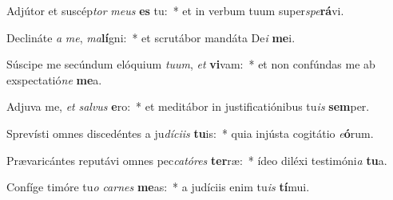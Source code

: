\item Adjútor et suscép\textit{tor} \textit{me}\textit{us} \textbf{es} tu:~* et in verbum tuum super\textit{spe}\textbf{rá}vi.
\item Declináte \textit{a} \textit{me}, \textit{ma}\textbf{lí}gni:~* et scrutábor mandáta De\textit{i} \textbf{me}i.
\item Súscipe me secúndum elóquium \textit{tu}\textit{um}, \textit{et} \textbf{vi}vam:~* et non confúndas me ab exspectatió\textit{ne} \textbf{me}a.
\item Adjuva me, \textit{et} \textit{sal}\textit{vus} \textbf{e}ro:~* et meditábor in justificatiónibus tu\textit{is} \textbf{sem}per.
\item Sprevísti omnes discedéntes a ju\textit{dí}\textit{ci}\textit{is} \textbf{tu}is:~* quia injústa cogitátio \textit{e}\textbf{ó}rum.
\item Prævaricántes reputávi omnes pec\textit{ca}\textit{tó}\textit{res} \textbf{ter}ræ:~* ídeo diléxi testimóni\textit{a} \textbf{tu}a.
\item Confíge timóre tu\textit{o} \textit{car}\textit{nes} \textbf{me}as:~* a judíciis enim tu\textit{is} \textbf{tí}mui.
